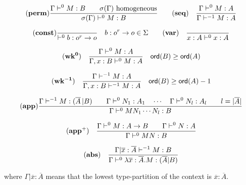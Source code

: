 \begin{table}[htbp]
$$  \mathbf{(perm)}
    \frac{\displaystyle 
      { \Gamma \vdash^0 M:B \qquad \sigma(\Gamma)  } \hbox{ homogeneous}
    }{ \sigma(\Gamma) \vdash^0 M : B
    }
\qquad
\mathbf{(seq)} \quad \frac{\displaystyle \Gamma \vdash^{0} M : A}{\Gamma \vdash^{-1} M : A}
$$

$$
 \mathbf{(const)}
    \frac{\displaystyle }{ \vdash^0 b : o^r \rightarrow o} \quad b : o^r \rightarrow o \in \Sigma
\qquad
 \mathbf{(var)} \quad  \frac{\displaystyle }{x : A\vdash^{0} x : A} $$

$$ \mathbf{(wk^{0})} \quad  \frac{\displaystyle \Gamma \vdash^{0} M : A}{\Gamma , x : B \vdash^{0} M : A} \quad {\sf ord}(B) \geq {\sf ord}(A) $$

$$ \mathbf{(wk^{-1})} \quad  \frac{\displaystyle \Gamma \vdash^{-1} M : A}{\Gamma , x : B \vdash^{-1} M : A} \quad {\sf ord}(B) \geq {\sf ord}(A) -1$$


$$ \mathbf{(app)}
    \frac{\displaystyle    \Gamma \vdash^{-1} M : (\overline{A} \, | B)
            \qquad
            \Gamma \vdash^0 N_1 : A_1 \quad \cdots \quad \Gamma \vdash^0 N_{l} : A_l \qquad l = |\overline{A}|
        }{
            \Gamma \vdash^0 M N_1 \cdots N_{l} : B
        }
$$

$$ \mathbf{(app^+)} \quad  \frac{\displaystyle \Gamma \vdash^0 M : A\rightarrow B
                                        \qquad \Gamma \vdash^{0} N : A
                                   }{\Gamma  \vdash^{0} M N : B}$$

$$ \mathbf{(abs)} \quad  \frac{\displaystyle \Gamma| \overline{x} : \overline{A} \vdash^{-1} M : B}{\Gamma  \vdash^{0} \lambda \overline{x} : \overline{A} . M : (\overline{A}|B)}$$


where $\Gamma| \overline{x} : \overline{A}$ means that the lowest type-partition of the context is
$\overline{x} : \overline{A}$.
\caption{Alternative rules for the homogeneous safe lambda calculus}
\label{tab:homosafelmd_rules_refined}
\end{table}
